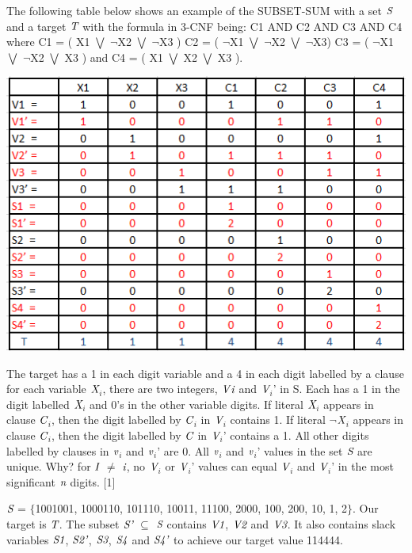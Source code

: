 \documentclass[a4paper]{report}
\begin{document}
\vspace{3mm}
The following table below shows an example of the SUBSET-SUM with a set $\emph{S}$ and a target $\emph{T}$ with the formula in 3-CNF being: C1 AND C2 AND C3 AND C4 where C1 = ( X1 $\bigvee$ $\neg$X2 $\bigvee$ $\neg$X3 ) C2 = ( $\neg$X1 $\bigvee$ $\neg$X2 $\bigvee$ $\neg$X3) C3 = ( $\neg$X1 $\bigvee$ $\neg$X2 $\bigvee$ X3 ) and C4 = ( X1 $\bigvee$ X2 $\bigvee$ X3 ).

\begin{center}
\includegraphics[scale=0.60]{subset.png}
\end{center}

The target has a 1 in each digit variable and a 4 in each digit labelled by a clause for each variable $\emph{X}$$_{i}$, there are two integers, $\emph{V}$$\emph{i}$ and $\emph{V}$$_{i}$' in S. Each has a 1 in the digit labelled $\emph{X}$$_{i}$ and 0's in the other variable digits. If literal $\emph{X}$$_{i}$ appears in clause $\emph{C}$$_{i}$, then the digit labelled by $\emph{C}$$_{i}$ in $\emph{V}$$_{i}$ contains 1. If literal $\neg$$\emph{X}$$_{i}$ appears in clause $\emph{C}$$_{i}$, then the digit labelled by $\emph{C}$ in $\emph{V}$$_{i}$' contains a 1. All other digits labelled by clauses in $\emph{v}$$_{i}$ and $\emph{v}$$_{i}$' are 0. All $\emph{v}$$_{i}$ and $\emph{v}$$_{i}$' values in the set $\emph{S}$ are unique. Why? for $\emph{I}$ $\neq$ $\emph{i}$, no $\emph{V}$$_{i}$ or $\emph{V}$$_{i}$' values can equal $\emph{V}$$_{i}$ and $\emph{V}$$_{i}$' in the most significant $\emph{n}$ digits. [1]

\vspace{3mm}
$\emph{S}$ = $\lbrace$1001001, 1000110, 101110, 10011, 11100, 2000, 100, 200, 10, 1, 2$\rbrace$. Our target is $\emph{T}$. The subset $\emph{S'}$ $\subseteq$ $\emph{S}$ contains $\emph{V1}$, $\emph{V2}$ and $\emph{V3}$. It also contains slack variables $\emph{S1}$, $\emph{S2'}$, $\emph{S3}$, $\emph{S4}$ and $\emph{S4'}$ to achieve our target value 114444.
\end{document}
